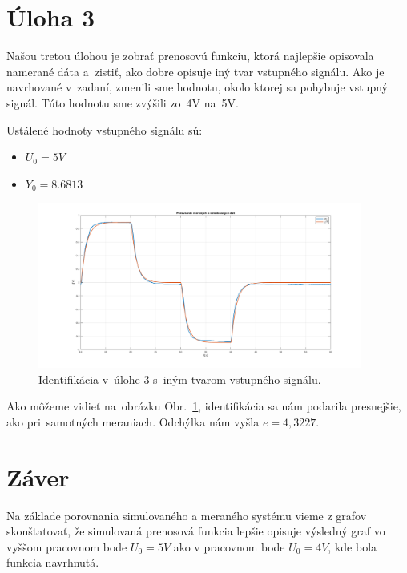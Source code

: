 \documentclass{article}
\begin{document}
\section{Úloha 3}
\label{subsec:U3}

Našou tretou úlohou je zobrať prenosovú funkciu, ktorá najlepšie opisovala namerané dáta a~zistiť, ako dobre opisuje
iný tvar vstupného signálu. Ako je navrhované v~zadaní, zmenili sme hodnotu, okolo ktorej sa pohybuje vstupný signál.
Túto hodnotu sme zvýšili zo~4V na~5V.

Ustálené hodnoty vstupného signálu sú:
\begin{itemize}
	\item $U_0 = 5V$
	\item $Y_0 = 8.6813$
\end{itemize}

\begin{figure}[!htbp]
	\begin{center}
		\includegraphics[width=0.95\textwidth]{include/uloha3.png}
	\end{center}
	\caption{Identifikácia v~úlohe 3 s~iným tvarom vstupného signálu.}
	\label{fig:u3}
\end{figure}

Ako môžeme vidieť na~obrázku Obr.~\ref{fig:u3}, identifikácia sa nám podarila presnejšie, ako pri~samotných meraniach.
Odchýlka nám vyšla $e = 4,3227$.

\clearpage

\section{Záver}
\label{sec:zaver}

Na základe porovnania simulovaného a meraného systému vieme z grafov skonštatovať, že simulovaná prenosová funkcia
lepšie opisuje výsledný graf vo vyššom pracovnom bode $U_0 = 5V$ ako v pracovnom bode $U_0 = 4V$, kde bola funkcia
navrhnutá.
\end{document}
